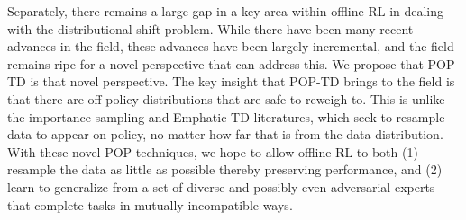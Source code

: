 \documentclass[11pt]{book}
\begin{document}
Separately, there remains a large gap in a key area within offline RL in dealing with the distributional shift problem. While there have been many recent advances in the field, these advances have been largely incremental, and the field remains ripe for a novel perspective that can address this. We propose that POP-TD is that novel perspective. The key insight that POP-TD brings to the field is that there are off-policy distributions that are safe to reweigh to. This is unlike the importance sampling and Emphatic-TD literatures, which seek to resample data to appear on-policy, no matter how far that is from the data distribution. With these novel POP techniques, we hope to allow offline RL to both (1) resample the data as little as possible thereby preserving performance, and (2) learn to generalize from a set of diverse and possibly even adversarial experts that complete tasks in mutually incompatible ways.

\appendix


\backmatter{}
\printbibliography{}
\end{document}
